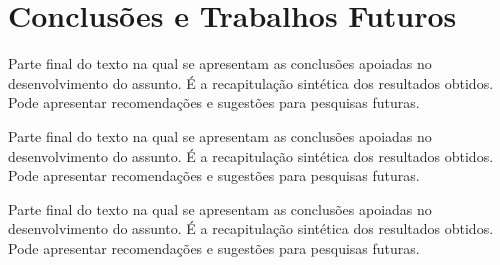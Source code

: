 \chapter{Conclusões e Trabalhos Futuros}
\label{chap:conclusoes-e-trabalhos-futuros}

Parte final do texto na qual se apresentam as conclusões apoiadas no desenvolvimento do assunto. É a recapitulação sintética dos resultados obtidos. Pode apresentar recomendações e sugestões para pesquisas futuras.

Parte final do texto na qual se apresentam as conclusões apoiadas no desenvolvimento do assunto. É a recapitulação sintética dos resultados obtidos. Pode apresentar recomendações e sugestões para pesquisas futuras.

Parte final do texto na qual se apresentam as conclusões apoiadas no desenvolvimento do assunto. É a recapitulação sintética dos resultados obtidos. Pode apresentar recomendações e sugestões para pesquisas futuras.